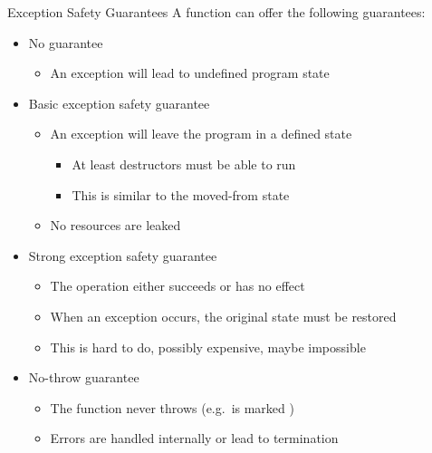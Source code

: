 \begin{advanced}
\begin{frame}[fragile]
  \begin{block}{Exception Safety Guarantees}
    A function can offer the following guarantees:
    \begin{itemize}
      \item No guarantee
      \begin{itemize}
        \item An exception will lead to undefined program state
      \end{itemize}
      \item Basic exception safety guarantee
      \begin{itemize}
        \item An exception will leave the program in a defined state
        \begin{itemize}
          \item At least destructors must be able to run
          \item This is similar to the moved-from state
        \end{itemize}
        \item No resources are leaked
      \end{itemize}
      \item Strong exception safety guarantee
      \begin{itemize}
        \item The operation either succeeds or has no effect
        \item When an exception occurs, the original state must be restored
        \item This is hard to do, possibly expensive, maybe impossible
      \end{itemize}
      \item No-throw guarantee
      \begin{itemize}
        \item The function never throws (e.g.\ is marked )
        \item Errors are handled internally or lead to termination
      \end{itemize}
    \end{itemize}
  \end{block}
\end{frame}


\end{advanced}
